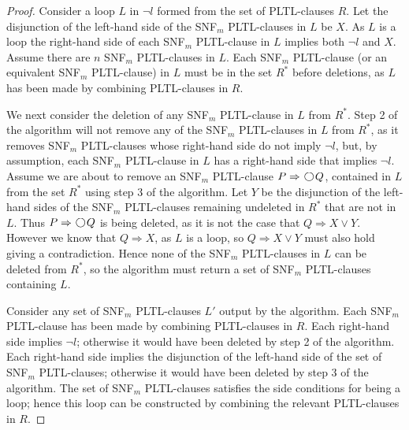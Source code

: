 \documentclass[nohyperref]{acmtrans2f}
\newcommand{\next}{\!\raisebox{-.2ex}{ %
                        \mbox{\unitlength=0.9ex
                        \begin{picture}(2,2)
                        \linethickness{0.06ex}
                        \put(1,1){\circle{2}} %
                        \end{picture}}}       %
                        \,}
\let\imp=\Rightarrow
\begin{document}
\begin{proof}
Consider a loop $L$ in $\neg l$ formed from the set of PLTL-clauses
$R$. Let the disjunction of the 
left-hand side of the SNF$_m$ PLTL-clauses in $L$ be $X$. As $L$ is a loop the right-hand
side of each SNF$_m$ PLTL-clause in $L$ implies both $\neg l$ and $X$. Assume there are
$n$ SNF$_m$ PLTL-clauses in $L$. Each SNF$_m$  PLTL-clause (or an
equivalent SNF$_m$  PLTL-clause) in $L$ must be in the
set $R^*$ before deletions, as $L$ has been made by combining PLTL-clauses in
$R$. 

We next consider the deletion of any SNF$_m$ PLTL-clause in $L$ from
$R^*$. Step 2 of 
the algorithm will not remove any of the SNF$_m$ PLTL-clauses in $L$ from
$R^*$, as it 
removes SNF$_m$ PLTL-clauses whose right-hand side do not imply $\neg l$,
but, by assumption, each 
SNF$_m$ PLTL-clause in $L$ has a right-hand side that implies $\neg
l$. Assume we are 
about to remove an SNF$_m$ PLTL-clause $P \imp \next Q$, contained in $L$
from the set 
$R^*$ using step 3 of the algorithm. Let $Y$ be the disjunction of the
left-hand sides of the SNF$_m$ PLTL-clauses remaining undeleted in $R^*$
that are not 
in $L$. Thus $P \imp \next Q$ is being deleted, as it is not the case
that $Q \imp X \lor Y$. However we know that $Q \imp X$, as $L$ is a
loop, so $Q \imp X \lor Y$ must also hold giving a
contradiction. Hence none of the SNF$_m$  PLTL-clauses in $L$ can be deleted from
$R^*$, so the algorithm must return a set of SNF$_m$  PLTL-clauses containing $L$.


Consider any set of SNF$_m$ PLTL-clauses $L'$ output by the algorithm. Each
SNF$_m$  PLTL-clause has been 
made by combining PLTL-clauses in $R$. Each right-hand side implies $\neg l$;
otherwise it would have been deleted by step 2 of the algorithm. Each
right-hand side implies the disjunction of the left-hand side of the set
of SNF$_m$ PLTL-clauses; otherwise it would have been deleted by step 3 of the
algorithm. The set of SNF$_m$ PLTL-clauses satisfies the side conditions for being a
loop; hence this loop can be constructed by combining the relevant PLTL-clauses in
$R$. 
\end{proof}
\end{document}
